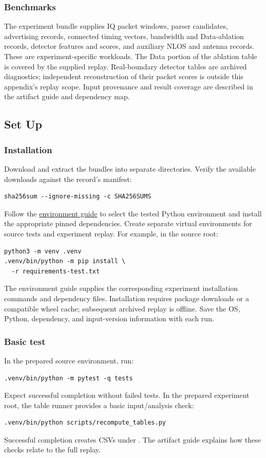 \documentclass[nonacm,sigconf]{acmart}
\newcommand{\envguide}{\href{https://github.com/Tincyu/PhantomChannel/blob/main/reproduction/ENVIRONMENT.md}{environment guide}}
\begin{document}
\subsubsection{Benchmarks}
The experiment bundle supplies IQ packet windows, parser candidates,
advertising records, connected timing vectors, bandwidth and Data-ablation
records, detector features and scores, and auxiliary NLOS and antenna records.
These are experiment-specific workloads. The Data portion of the ablation table
is covered by the supplied replay. Real-boundary detector tables are archived
diagnostics; independent reconstruction of their packet scores is outside this
appendix's replay scope. Input provenance and result coverage are described in
the artifact guide and dependency map.

\subsection{Set Up}
\subsubsection{Installation}
Download and extract the bundles into separate directories. Verify the
available downloads against the record's manifest:
\begin{verbatim}
sha256sum --ignore-missing -c SHA256SUMS
\end{verbatim}
Follow the \envguide{} to select the tested Python environment and install the
appropriate pinned dependencies. Create separate virtual environments for
source tests and experiment replay. For example, in the source root:
\begin{verbatim}
python3 -m venv .venv
.venv/bin/python -m pip install \
  -r requirements-test.txt
\end{verbatim}
The environment guide supplies the corresponding experiment installation
commands and dependency files. Installation requires package downloads or a
compatible wheel cache; subsequent archived replay is offline. Save the OS,
Python, dependency, and input-version information with each run.

\clearpage
\balance
\subsubsection{Basic test}
In the prepared source environment, run:
\begin{verbatim}
.venv/bin/python -m pytest -q tests
\end{verbatim}
Expect successful completion without failed tests. In the prepared experiment
root, the table runner provides a basic input/analysis check:
\begin{verbatim}
.venv/bin/python scripts/recompute_tables.py
\end{verbatim}
Successful completion creates CSVs under .
The artifact guide explains how these checks relate to the full replay.
\end{document}
